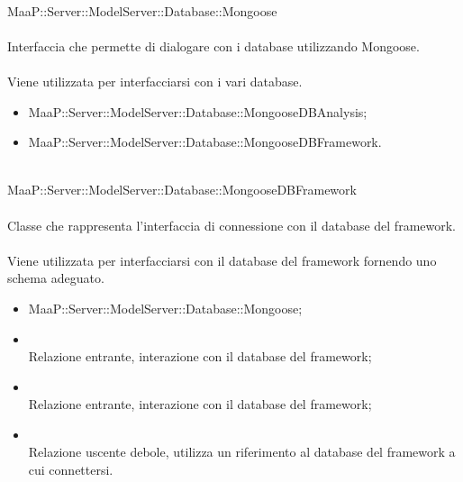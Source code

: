 \\
MaaP::Server::ModelServer::Database::Mongoose\\
\\
Interfaccia che permette di dialogare con i database utilizzando Mongoose.\\
\\
Viene utilizzata per interfacciarsi con i vari database.\\
\begin{itemize}
\item MaaP::Server::ModelServer::Database::MongooseDBAnalysis;
\item MaaP::Server::ModelServer::Database::MongooseDBFramework.
\end{itemize}

\\
MaaP::Server::ModelServer::Database::MongooseDBFramework\\
\\
Classe che rappresenta l'interfaccia di connessione con il database del framework.\\
\\
Viene utilizzata per interfacciarsi con il database del framework fornendo uno schema adeguato.\\
\begin{itemize}
\item MaaP::Server::ModelServer::Database::Mongoose;
\end{itemize}
\begin{itemize}
\item{}\\
Relazione entrante, interazione con il database del framework;
\item{}\\
Relazione entrante, interazione con il database del framework;
\item{}\\
Relazione uscente debole, utilizza un riferimento al database del framework a cui connettersi.
\end{itemize}


